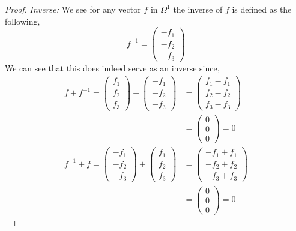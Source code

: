 \documentclass[12pt]{article}
\begin{document}
\begin{itemize}
\begin{itemize}
\begin{proof}
                \textit{Inverse:}  We see for any vector $f$ in $\Omega^1$ the inverse of $f$ is defined as the following, \[f^{-1} = \begin{pmatrix}-f_1 \\ -f_2 \\ -f_3 \end{pmatrix}\]
                We can see that this does indeed serve as an inverse since,
                \begin{align*}
                    f + f^{-1} = \begin{pmatrix}f_1 \\ f_2 \\ f_3 \end{pmatrix} + \begin{pmatrix}-f_1 \\ -f_2 \\ -f_3 \end{pmatrix} &= \begin{pmatrix}f_1 -f_1\\ f_2-f_2 \\ f_3-f_3 \end{pmatrix} \\
                    &= \begin{pmatrix}0 \\ 0 \\ 0 \end{pmatrix} = 0 \\
                    f^{-1} + f = \begin{pmatrix}-f_1 \\ -f_2 \\ -f_3 \end{pmatrix} + \begin{pmatrix}f_1 \\ f_2 \\ f_3 \end{pmatrix} &= \begin{pmatrix}-f_1 +f_1\\ -f_2+f_2 \\ -f_3+f_3 \end{pmatrix} \\
                    &= \begin{pmatrix}
                        0\\0\\0
                    \end{pmatrix} = 0
                \end{align*}


\end{proof}
\end{itemize}
\end{itemize}
\end{document}
